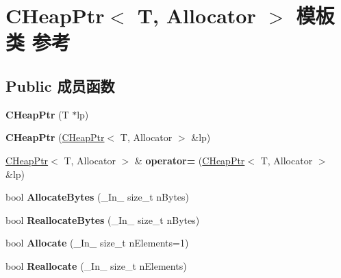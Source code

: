 \hypertarget{class_c_heap_ptr}{}\section{C\+Heap\+Ptr$<$ T, Allocator $>$ 模板类 参考}
\label{class_c_heap_ptr}
\subsection*{Public 成员函数}
\begin{DoxyCompactItemize}
\item 
\mbox{\label{class_c_heap_ptr_a4213e6eb8ef41b1f702a648ec91a6821}} 
{\bfseries C\+Heap\+Ptr} (T $\ast$lp)
\item 
\mbox{\label{class_c_heap_ptr_aaa3ea3f2c026352a6846c8f4a8856ad9}} 
{\bfseries C\+Heap\+Ptr} (\hyperlink{class_c_heap_ptr}{C\+Heap\+Ptr}$<$ T, Allocator $>$ \&lp)
\item 
\mbox{\label{class_c_heap_ptr_a4b9a364b98c5c04c0c1341602fa27e29}} 
\hyperlink{class_c_heap_ptr}{C\+Heap\+Ptr}$<$ T, Allocator $>$ \& {\bfseries operator=} (\hyperlink{class_c_heap_ptr}{C\+Heap\+Ptr}$<$ T, Allocator $>$ \&lp)
\item 
\mbox{\label{class_c_heap_ptr_aa768f6c07510abed3b61bfbf9682b379}} 
bool {\bfseries Allocate\+Bytes} (\+\_\+\+In\+\_\+ size\+\_\+t n\+Bytes)
\item 
\mbox{\label{class_c_heap_ptr_a5c07b620c2052b5d6f1ab32a69010eef}} 
bool {\bfseries Reallocate\+Bytes} (\+\_\+\+In\+\_\+ size\+\_\+t n\+Bytes)
\item 
\mbox{\label{class_c_heap_ptr_ac6e2e1f734e1bb05fe5d7990f3d0491a}} 
bool {\bfseries Allocate} (\+\_\+\+In\+\_\+ size\+\_\+t n\+Elements=1)
\item 
\mbox{\label{class_c_heap_ptr_a1652dc118058f4ff18bed2fae5e8c269}} 
bool {\bfseries Reallocate} (\+\_\+\+In\+\_\+ size\+\_\+t n\+Elements)
\item 
\mbox{\label{class_c_heap_ptr_a5c363d9dffb51427ee105e0d82936281}} 

\end{DoxyCompactItemize}
